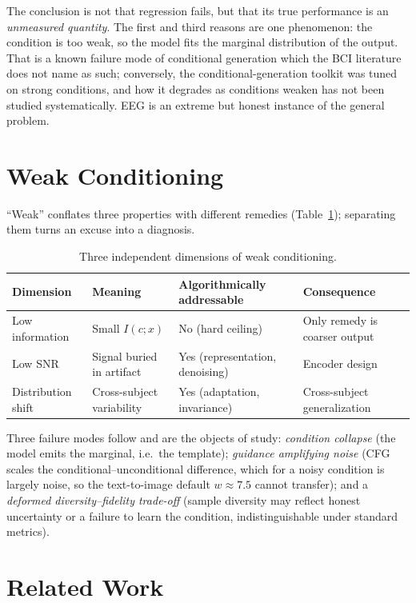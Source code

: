 \documentclass[11pt]{article}
\begin{document}
The conclusion is not that regression fails, but that its true performance is an \emph{unmeasured quantity}. The first and third reasons are one phenomenon: the condition is too weak, so the model fits the marginal distribution of the output. That is a known failure mode of conditional generation which the BCI literature does not name as such; conversely, the conditional-generation toolkit was tuned on strong conditions, and how it degrades as conditions weaken has not been studied systematically. EEG is an extreme but honest instance of the general problem.

\section{Weak Conditioning}

``Weak'' conflates three properties with different remedies (Table~\ref{tab:weak}); separating them turns an excuse into a diagnosis.

\begin{table}[h]
\centering\small
\begin{tabular}{@{}p{2.5cm}p{3.1cm}p{3.9cm}p{4.2cm}@{}}
\toprule
Dimension & Meaning & Algorithmically addressable & Consequence \\
\midrule
Low information & Small $I(c;x)$ & No (hard ceiling) & Only remedy is coarser output \\
Low SNR & Signal buried in artifact & Yes (representation, denoising) & Encoder design \\
Distribution shift & Cross-subject variability & Yes (adaptation, invariance) & Cross-subject generalization \\
\bottomrule
\end{tabular}
\caption{Three independent dimensions of weak conditioning.}
\label{tab:weak}
\end{table}

\vspace{-0.5em}
Three failure modes follow and are the objects of study: \emph{condition collapse} (the model emits the marginal, i.e.\ the template); \emph{guidance amplifying noise} (CFG scales the conditional--unconditional difference, which for a noisy condition is largely noise, so the text-to-image default $w\approx7.5$ cannot transfer); and a \emph{deformed diversity--fidelity trade-off} (sample diversity may reflect honest uncertainty or a failure to learn the condition, indistinguishable under standard metrics).

\section{Related Work}
\end{document}
